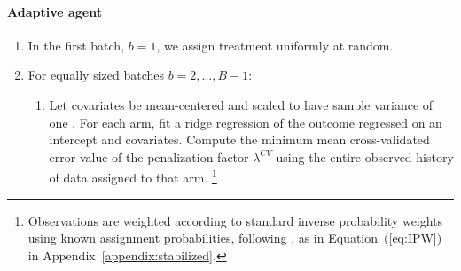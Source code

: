 \documentclass[letterpaper, 12pt, parskip=full,]{scrartcl}
\begin{document}
\paragraph{Adaptive agent}

\begin{enumerate}
\item In the first batch, $b = 1$, we assign treatment uniformly at random. 

\item For equally sized batches $b = 2, \dots, B-1$:

\begin{enumerate}
   \item \label{step:fit} Let covariates be mean-centered and scaled to have sample variance of one \citep{marquardt1980you}. For each arm, fit a ridge regression of the outcome regressed on an intercept and covariates. Compute the minimum mean cross-validated error value of the penalization factor $\lambda^{CV}$ using the entire observed history of data assigned to that arm.%
 \footnote{%
% 
%
%
Observations are weighted according to standard inverse probability weights using known assignment probabilities, following \cite{dimakopoulou2017estimation}, as in Equation~(\ref{eq:IPW}) in Appendix~\ref{appendix:stabilized}. %
}
  

\end{enumerate}
\end{enumerate}
\end{document}
